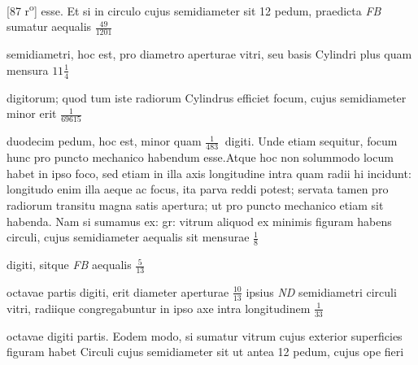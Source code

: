 [87 r\textsuperscript{o}] esse. Et si in circulo cujus semidiameter sit 12 pedum, praedicta \textit{FB} sumatur aequalis $\displaystyle\frac{49}{1201}\:$\rule[-4mm]{0mm}{10mm}
semidiametri, hoc est, pro diametro aperturae vitri, seu basis Cylindri plus quam mensura $\displaystyle11\frac{1}{4}\:$\rule[-4mm]{0mm}{10mm}
digitorum; quod tum iste radiorum Cylindrus efficiet focum, cujus semidiameter minor erit $\displaystyle\frac{1}{69615}\:$\rule[-4mm]{0mm}{10mm}
duodecim pedum, hoc est, minor quam $\displaystyle\frac{1}{483}\:$
digiti. Unde etiam sequitur, focum hunc pro puncto mechanico\protect{} habendum esse.\pend \pstart Atque hoc non solummodo locum habet in ipso foco, sed etiam in illa axis longitudine intra quam radii hi incidunt: longitudo enim illa aeque ac focus, ita parva reddi potest; servata tamen pro radiorum transitu magna satis apertura; ut pro puncto mechanico\protect{} etiam sit habenda. Nam si sumamus ex: gr: vitrum aliquod ex minimis figuram habens circuli, cujus semidiameter aequalis sit mensurae $\displaystyle\frac{1}{8}$\rule[-4mm]{0mm}{10mm} digiti, sitque \textit{FB} aequalis $\displaystyle\frac{5}{13}\:$\rule[-4mm]{0mm}{10mm} octavae partis digiti, erit diameter aperturae $\displaystyle\frac{10}{13}$ ipsius \textit{ND} semidiametri circuli vitri, radiique congregabuntur in ipso axe intra longitudinem $\displaystyle \frac{1}{33}$\rule[-4mm]{0mm}{10mm} octavae digiti partis. Eodem modo, si sumatur vitrum cujus exterior superficies figuram habet Circuli cujus semidiameter sit ut antea 12 pedum, cujus ope fieri 